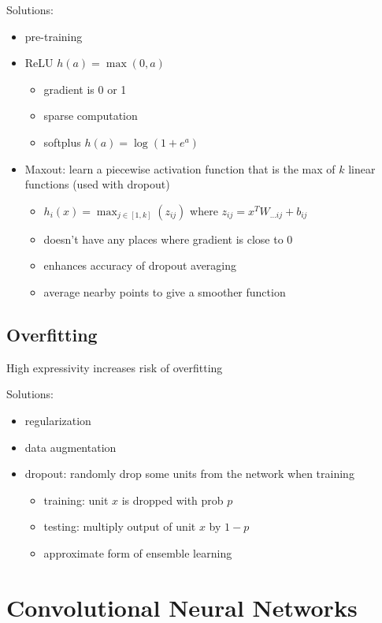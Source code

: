 \documentclass[]{article}
\theoremstyle{definition}
\begin{document}
Solutions:
\begin{itemize}
    \item pre-training
    \item ReLU $h(a) = \max(0, a)$
        \begin{itemize}
            \item gradient is 0 or 1
            \item sparse computation
            \item softplus $h(a) = \log (1 + e^a)$
        \end{itemize}
    \item Maxout: learn a piecewise activation function that is the max of $k$ linear functions (used with dropout)
        \begin{itemize}
            \item $h_i(x) = \max_{j \in [1, k]} (z_{ij})$ where $z_{ij} = x^T W_{ \ldots ij} + b_{ij}$
            \item doesn't have any places where gradient is close to 0
            \item enhances accuracy of dropout averaging
            \item average nearby points to give a smoother function
        \end{itemize}
\end{itemize}

\subsection{Overfitting}
\label{sub:overfitting}

High expressivity increases risk of overfitting

Solutions:
\begin{itemize}
    \item regularization
    \item data augmentation
    \item dropout: randomly drop some units from the network when training
        \begin{itemize}
            \item training: unit $x$ is dropped with prob $p$
            \item testing: multiply output of unit $x$ by $1-p$
            \item approximate form of ensemble learning
        \end{itemize}
\end{itemize}


\section{Convolutional Neural Networks}
\label{sec:convolutional_neural_networks}
\end{document}
